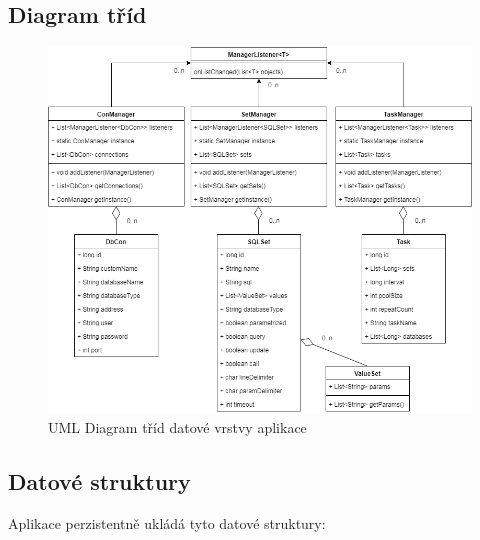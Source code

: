 \documentclass[czech,bachelor,public,dept460,male,cpdeclaration,twoside]{diploma}
\begin{document}
\subsection{Diagram tříd} \label{datadiagram}
\begin{figure}[!htbp]\centering\includegraphics[width=1.0\textwidth]{Figures/datadiagram.png}\caption{UML Diagram tříd datové vrstvy aplikace}
\end{figure}

\newpage

\subsection{Datové struktury} \label{datastruct}
Aplikace perzistentně ukládá tyto datové struktury:
\end{document}
